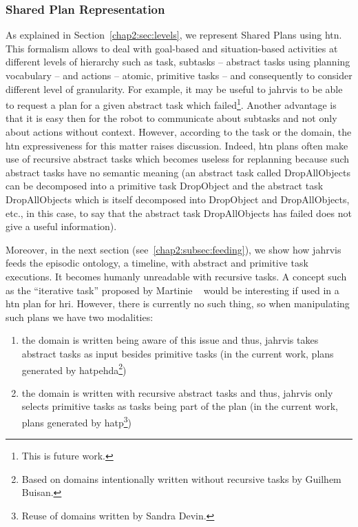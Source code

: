 \documentclass[a4paper,11pt,twoside]{StyleThese}
\begin{document}
\subsubsection{Shared Plan Representation}\label{chap2:subsubsec:shared_p_rep}
As explained in Section~\ref{chap2:sec:levels}, we represent Shared Plans using \acrfull{htn}. This formalism allows to deal with goal-based and situation-based activities at different levels of hierarchy such as task, subtasks -- abstract tasks using planning vocabulary -- and actions -- atomic, primitive tasks -- and consequently to consider different level of granularity. For example, it may be useful to \acrshort{jahrvis} to be able to request a plan for a given abstract task which failed\footnote{This is future work.}. Another advantage is that it is easy then for the robot to communicate about subtasks and not only about actions without context. However, according to the task or the domain, the \acrshort{htn} expressiveness for this matter raises discussion. Indeed, \acrshort{htn} plans often make use of recursive abstract tasks which becomes useless for replanning because such abstract tasks have no semantic meaning (\eg an abstract task called DropAllObjects can be decomposed into a primitive task DropObject and the abstract task DropAllObjects which is itself decomposed into DropObject and DropAllObjects, etc., in this case, to say that the abstract task DropAllObjects has failed does not give a useful information). 

Moreover, in the next section (see~\ref{chap2:subsec:feeding}), we show how \acrshort{jahrvis} feeds the episodic ontology, a timeline, with abstract and primitive task executions. It becomes humanly unreadable with recursive tasks. A concept such as the ``iterative task'' proposed by Martinie \etal{}~\cite{martinie_2011_structuring} would be interesting if used in a \acrshort{htn} plan for \acrshort{hri}. However, there is currently no such thing, so when manipulating such plans we have two modalities:
\begin{enumerate}
	\item the domain is written being aware of this issue and thus, \acrshort{jahrvis} takes abstract tasks as input besides primitive tasks (\ie in the current work, plans generated by \acrshort{hatpehda}\footnote{Based on domains intentionally written without recursive tasks by Guilhem Buisan.})
	\item the domain is written with recursive abstract tasks and thus, \acrshort{jahrvis} only selects primitive tasks as tasks being part of the plan (\ie in the current work, plans generated by \acrshort{hatp}\footnote{Reuse of domains written by Sandra Devin.})
\end{enumerate}
\end{document}
